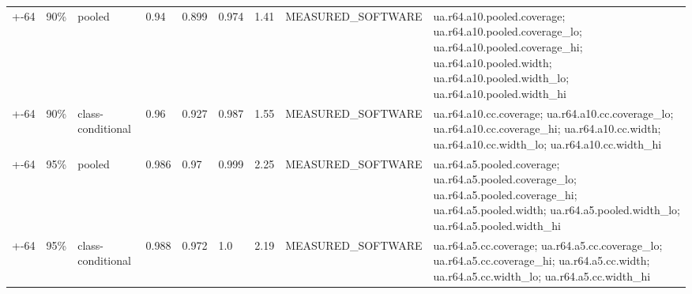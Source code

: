 \begin{table}[t]
\begin{tabular}{lllllllll}
+-64 & 90\% & pooled & 0.94 & 0.899 & 0.974 & 1.41 & MEASURED\_SOFTWARE & ua.r64.a10.pooled.coverage; ua.r64.a10.pooled.coverage\_lo; ua.r64.a10.pooled.coverage\_hi; ua.r64.a10.pooled.width; ua.r64.a10.pooled.width\_lo; ua.r64.a10.pooled.width\_hi \\
+-64 & 90\% & class-conditional & 0.96 & 0.927 & 0.987 & 1.55 & MEASURED\_SOFTWARE & ua.r64.a10.cc.coverage; ua.r64.a10.cc.coverage\_lo; ua.r64.a10.cc.coverage\_hi; ua.r64.a10.cc.width; ua.r64.a10.cc.width\_lo; ua.r64.a10.cc.width\_hi \\
+-64 & 95\% & pooled & 0.986 & 0.97 & 0.999 & 2.25 & MEASURED\_SOFTWARE & ua.r64.a5.pooled.coverage; ua.r64.a5.pooled.coverage\_lo; ua.r64.a5.pooled.coverage\_hi; ua.r64.a5.pooled.width; ua.r64.a5.pooled.width\_lo; ua.r64.a5.pooled.width\_hi \\
+-64 & 95\% & class-conditional & 0.988 & 0.972 & 1.0 & 2.19 & MEASURED\_SOFTWARE & ua.r64.a5.cc.coverage; ua.r64.a5.cc.coverage\_lo; ua.r64.a5.cc.coverage\_hi; ua.r64.a5.cc.width; ua.r64.a5.cc.width\_lo; ua.r64.a5.cc.width\_hi \\
\bottomrule
\end{tabular}
\end{table}
